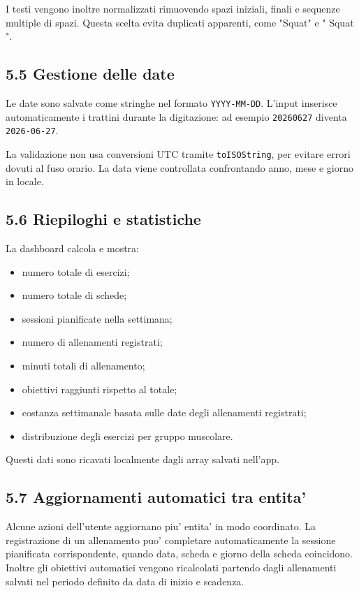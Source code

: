 \documentclass[11pt,a4paper]{article}
\begin{document}
I testi vengono inoltre normalizzati rimuovendo spazi iniziali, finali e sequenze multiple di spazi. Questa scelta evita duplicati apparenti, come "Squat" e "  Squat  ".

\subsection{5.5 Gestione delle date}

Le date sono salvate come stringhe nel formato \texttt{YYYY-MM-DD}. L'input inserisce automaticamente i trattini durante la digitazione: ad esempio \texttt{20260627} diventa \texttt{2026-06-27}.

La validazione non usa conversioni UTC tramite \texttt{toISOString}, per evitare errori dovuti al fuso orario. La data viene controllata confrontando anno, mese e giorno in locale.

\subsection{5.6 Riepiloghi e statistiche}

La dashboard calcola e mostra:

\begin{itemize}
  \item numero totale di esercizi;
  \item numero totale di schede;
  \item sessioni pianificate nella settimana;
  \item numero di allenamenti registrati;
  \item minuti totali di allenamento;
  \item obiettivi raggiunti rispetto al totale;
  \item costanza settimanale basata sulle date degli allenamenti registrati;
  \item distribuzione degli esercizi per gruppo muscolare.
\end{itemize}

Questi dati sono ricavati localmente dagli array salvati nell'app.

\subsection{5.7 Aggiornamenti automatici tra entita'}

Alcune azioni dell'utente aggiornano piu' entita' in modo coordinato. La registrazione di un allenamento puo' completare automaticamente la sessione pianificata corrispondente, quando data, scheda e giorno della scheda coincidono. Inoltre gli obiettivi automatici vengono ricalcolati partendo dagli allenamenti salvati nel periodo definito da data di inizio e scadenza.
\end{document}
